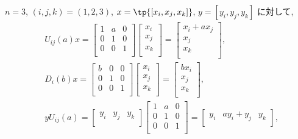 \documentclass[12pt,twoside]{jarticle}
\begin{document}
\medskip

$n=3$, $(i,j,k)=(1,2,3)$, $x=\tp{[x_i,x_j,x_k]}$, $y=[y_i,y_j,y_k]$ に対して,
\begin{align*}
  &
  U_{ij}(a)x = 
  \begin{bmatrix}
    1 & a & 0 \\
    0 & 1 & 0 \\
    0 & 0 & 1 \\
  \end{bmatrix}
  \begin{bmatrix}
    x_i \\ x_j \\ x_k \\
  \end{bmatrix}
  =
  \begin{bmatrix}
    x_i + a x_j \\ x_j \\ x_k \\
  \end{bmatrix},
  \\ &
  D_i(b)x =
  \begin{bmatrix}
    b & 0 & 0 \\
    0 & 1 & 0 \\
    0 & 0 & 1 \\
  \end{bmatrix}
  \begin{bmatrix}
    x_i \\ x_j \\ x_k \\
  \end{bmatrix}
  =
  \begin{bmatrix}
    b x_i \\ x_j \\ x_k \\
  \end{bmatrix},
  \\ &
  y U_{ij}(a) = 
  \begin{bmatrix}
    y_i & y_j & y_k \\
  \end{bmatrix}
  \begin{bmatrix}
    1 & a & 0 \\
    0 & 1 & 0 \\
    0 & 0 & 1 \\
  \end{bmatrix}
  =
  \begin{bmatrix}
    y_i & ay_i + y_j & y_k \\
  \end{bmatrix},

\end{align*}
\end{document}
